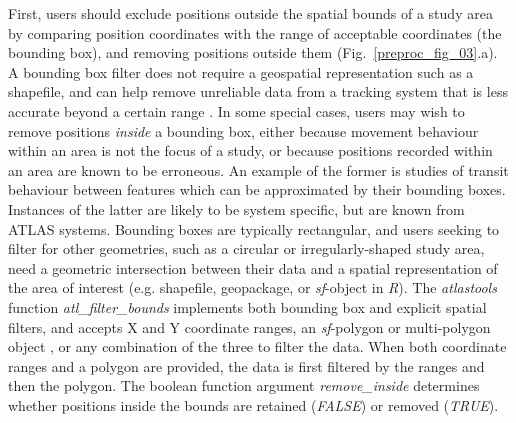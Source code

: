 First, users should exclude positions outside the spatial bounds of a study area by comparing position coordinates with the range of acceptable coordinates (the bounding box), and removing positions outside them (Fig.~\ref{preproc_fig_03}.a). 
A bounding box filter does not require a geospatial representation such as a shapefile, and can help remove unreliable data from a tracking system that is less accurate beyond a certain range \citep[][]{beardsworth2022mee}.
In some special cases, users may wish to remove positions \textit{inside} a bounding box, either because movement behaviour within an area is not the focus of a study, or because positions recorded within an area are known to be erroneous.
An example of the former is studies of transit behaviour between features which can be approximated by their bounding boxes. 
Instances of the latter are likely to be system specific, but are known from ATLAS systems. 
Bounding boxes are typically rectangular, and users seeking to filter for other geometries, such as a circular or irregularly-shaped study area, need a geometric intersection between their data and a spatial representation of the area of interest (e.g. shapefile, geopackage, or \textit{sf}-object in \textit{R}).
The \textit{atlastools} function \textit{atl\_filter\_bounds} implements both bounding box and explicit spatial filters, and accepts X and Y coordinate ranges, an \textit{sf}-polygon or multi-polygon object \citep{pebesma2018}, or any combination of the three to filter the data.
When both coordinate ranges and a polygon are provided, the data is first filtered by the ranges and then the polygon.
The boolean function argument \textit{remove\_inside} determines whether positions inside the bounds are retained (\textit{FALSE}) or removed (\textit{TRUE}).


